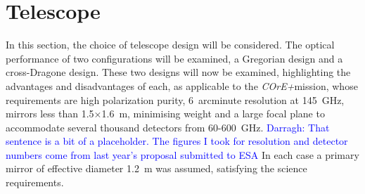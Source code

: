 \documentclass[11pt,a4paper]{article}
\newcommand{\comblue}[1]{\textcolor{blue}{#1}}
\newcommand{\coreplus}{\textit{\negthinspace COrE+\/}}
\begin{document}
\section{Telescope}
In this section, the choice of telescope design will be considered. The optical performance of two configurations will be examined, a Gregorian design and a cross-Dragone design. These two designs will now be examined, highlighting the advantages and disadvantages of each, as applicable to the \coreplus mission, whose requirements are high polarization purity, 6~arcminute resolution at 145~GHz, mirrors less than 1.5$\times$1.6~m, minimising weight and a large focal plane to accommodate several thousand detectors from 60-600~GHz. \comblue{Darragh: That sentence is a bit of a placeholder. The figures I took for resolution and detector numbers come from last year's proposal submitted to ESA} In each case a primary mirror of effective diameter 1.2~m was assumed, satisfying the science requirements.
\end{document}
